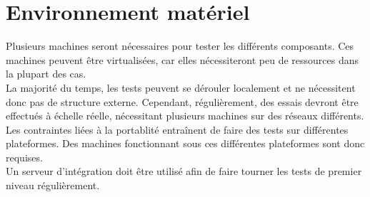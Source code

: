 \section{Environnement matériel}
Plusieurs machines seront nécessaires pour tester les différents composants. Ces machines peuvent être virtualisées, car elles nécessiteront peu de ressources dans la plupart des cas.\\

La majorité du temps, les tests peuvent se dérouler localement et ne nécessitent donc pas de structure externe. Cependant, régulièrement, des essais devront être effectués à échelle réelle, nécessitant plusieurs machines sur des réseaux différents.\\

Les contraintes liées à la portablité entraînent de faire des tests sur différentes plateformes. Des machines fonctionnant sous ces différentes plateformes sont donc requises.\\

Un serveur d'intégration doit être utilisé afin de faire tourner les tests de premier niveau régulièrement.\\
